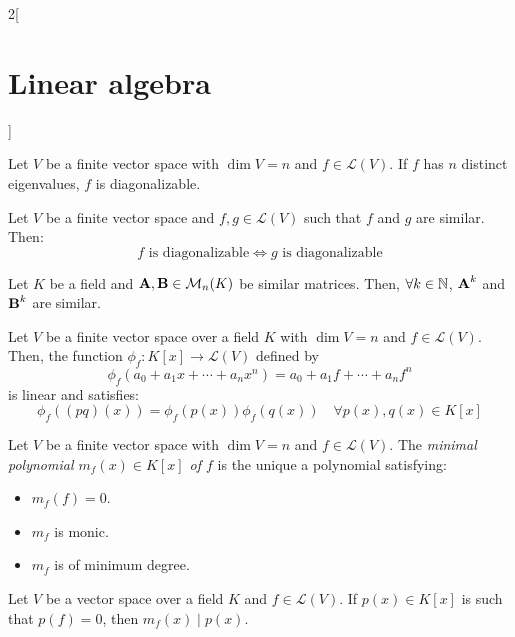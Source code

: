\documentclass[../../../main.tex]{subfiles}
\begin{document}
\begin{multicols}{2}[\section{Linear algebra}]
\begin{theorem}
\begin{enumerate}
    \end{enumerate}
  \end{theorem}
  \begin{corollary}
    Let $V$ be a finite vector space with $\dim V=n$ and $f\in\mathcal{L}(V)$. If $f$ has $n$ distinct eigenvalues, $f$ is diagonalizable.
  \end{corollary}
  \begin{prop}
    Let $V$ be a finite vector space and $f,g\in\mathcal{L}(V)$ such that $f$ and $g$ are similar. Then: $$f\text{ is diagonalizable}\iff g\text{ is diagonalizable}$$
  \end{prop}
  \begin{lemma}
    Let $K$ be a field and $\boldsymbol{\mathrm{A}},\boldsymbol{\mathrm{B}}\in\mathcal{M}_n(K)$ be similar matrices. Then, $\forall k\in\mathbb{N}$, $\boldsymbol{\mathrm{A}}^k$ and $\boldsymbol{\mathrm{B}}^k$ are similar.
  \end{lemma}
  \begin{lemma}
    Let $V$ be a finite vector space over a field $K$ with $\dim V=n$ and $f\in\mathcal{L}(V)$. Then, the function $\phi_f:K[x]\rightarrow\mathcal{L}(V)$ defined by $$\phi_f(a_0+a_1x+\cdots+a_nx^n)=a_0+a_1f+\cdots+a_nf^n$$
    is linear and satisfies: $$\phi_f((pq)(x))=\phi_f(p(x))\phi_f(q(x))\quad\forall p(x),q(x)\in K[x]$$
  \end{lemma}
  \begin{definition}
    Let $V$ be a finite vector space with $\dim V=n$ and $f\in\mathcal{L}(V)$. The \textit{minimal polynomial $m_f(x)\in K[x]$ of $f$} is the unique a polynomial satisfying:
    \begin{itemize}
      \item $m_f(f)=0$.
      \item $m_f$ is monic.
      \item $m_f$ is of minimum degree.
    \end{itemize}
  \end{definition}
  \begin{prop}
    Let $V$ be a vector space over a field $K$ and $f\in\mathcal{L}(V)$. If $p(x)\in K[x]$ is such that $p(f)=0$, then $m_f(x)\mid p(x)$.
  \end{prop}

\end{multicols}
\end{document}
